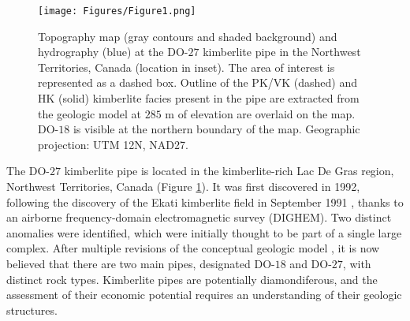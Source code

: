\documentclass[paper, twocolumn]{geophysics} %
\begin{document}

\begin{figure}
\centering
\texttt{[image: Figures/Figure1.png]}
\caption{Topography map (gray contours and shaded background) and hydrography (blue) at the DO-$27$ kimberlite pipe in the Northwest Territories, Canada (location in inset). The area of interest is represented as a dashed box. Outline of the PK/VK (dashed) and HK (solid) kimberlite facies present in the pipe are extracted from the geologic model at $285$ m of elevation are overlaid on the map. DO-$18$ is visible at the northern boundary of the map. Geographic projection: UTM 12N, NAD27.}
\label{fig:Figure1.png}
\end{figure}

The DO-$27$ kimberlite pipe is located in the kimberlite-rich Lac De Gras region, Northwest Territories, Canada (Figure \ref{fig:Figure1.png}). It was first discovered in 1992, following the discovery of the Ekati kimberlite field in September 1991 \citep{DiamondsInCanada}, thanks to an airborne frequency-domain electromagnetic survey (DIGHEM). Two distinct anomalies were identified, which were initially thought to be part of a single large complex. After multiple revisions of the conceptual geologic model \citep{HARDER2009}, it is now believed that there are two main pipes, designated DO-$18$ and DO-$27$, with distinct rock types. Kimberlite pipes are potentially diamondiferous, and the assessment of their economic potential requires an understanding of their geologic structures.

\end{document}
